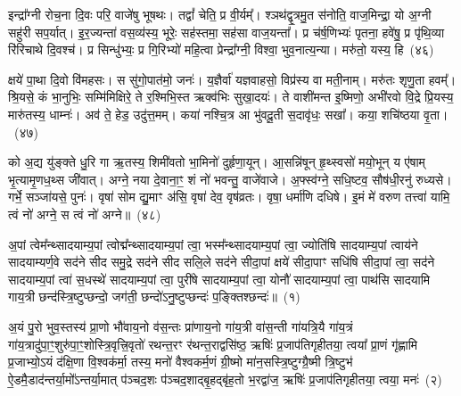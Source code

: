 इन्द्रा᳚ग्नी रोच॒ना दि॒वः परि॒ वाजे॑षु भूषथः। तद्वां᳚ चेति॒ प्र वी॒र्यम्᳚। श्ञथ॑द्वृ॒त्रमु॒त स॑नोति॒ वाज॒मिन्द्रा॒ यो अ॒ग्नी सहु॑री सप॒र्यात्। इ॒र॒ज्यन्ता॑ वस॒व्य॑स्य॒ भूरेः॒ सह॑स्तमा॒ सह॑सा वाज॒यन्ता᳚। प्र च॑र्\mbox{}ष॒णिभ्यः॑ पृतना॒ हवे॑षु॒ प्र पृ॑थि॒व्या रि॑रिचाथे दि॒वश्च॑। प्र सिन्धु॑भ्यः॒ प्र गि॒रिभ्यो॑ महि॒त्वा प्रेन्द्रा᳚ग्नी॒ विश्वा॒ भुव॒नात्य॒न्या। मरु॑तो॒ यस्य॒ हि~(४६)

क्षये॑ पा॒था दि॒वो वि॑महसः। स सु॑गो॒पात॑मो॒ जनः॑। य॒ज्ञैर्वा॑ यज्ञवाहसो॒ विप्र॑स्य वा मती॒नाम्। मरु॑तः शृणु॒ता हवम्᳚। श्रि॒यसे॒ कं भा॒नुभिः॒ सम्मि॑मिक्षिरे॒ ते र॒श्मिभि॒स्त ऋक्व॑भिः सुखा॒दयः॑। ते वाशी॑मन्त इ॒ष्मिणो॒ अभी॑रवो वि॒द्रे प्रि॒यस्य॒ मारु॑तस्य॒ धाम्नः॑। अव॑ ते॒ हेड॒ उदु॑त्त॒मम्। कया॑ नश्चि॒त्र आ भु॑वदू॒ती स॒दावृ॑धः॒ सखा᳚। कया॒ शचि॑ष्ठया वृ॒ता।~(४७)

को अ॒द्य यु॑ङ्क्ते धु॒रि गा ऋ॒तस्य॒ शिमी॑वतो भा॒मिनो॑ दुर्\mbox{}हृणा॒यून्। आ॒सन्नि॑षून् हृ॒थ्स्वसो॑ मयो॒भून् य ए॑षाम् भृ॒त्यामृ॒णध॒थ्स जी॑वात्। अग्ने॒ नया दे॒वाना॒ꣳ॒ शं नो॑ भवन्तु॒ वाजे॑वाजे। अ॒फ्स्व॑ग्ने॒ सधि॒ष्टव॒ सौष॑धी॒रनु॑ रुध्यसे। गर्भे॒ सञ्जा॑यसे॒ पुनः॑। वृषा॑ सोम द्यु॒माꣳ अ॑सि॒ वृषा॑ देव॒ वृष॑व्रतः। वृषा॒ धर्मा॑णि दधिषे। इ॒मं मे॑ वरुण तत्त्वा॑ यामि॒ त्वं नो॑ अग्ने॒ स त्वं नो॑ अग्ने॥~(४८)

{\anuvakamend[{हि वृ॒ता म॒ एका॑\-दश च}]}%


{\anuvakamend[{अ॒पां त्वेम॑न्न॒यं पु॒रो भुवः॒ प्राची᳚ ध्रु॒वक्षि॑ति॒स्त्र्यवि॒रिन्द्रा᳚ग्नी॒ मा छन्द॑ आ॒शुस्त्रि॒वृद॒ग्नेर्भा॒गो᳚\-ऽस्येक॑ये॒यमे॒व सा याग्ने॑ जा॒तान॒ग्निर्वृ॒त्राणि॒ त्रयो॑दश}]}%
{}

\setcounter{anuvakam}{0}
अ॒पां त्वेम᳚न्थ्सादयाम्य॒पां त्वोद्म᳚न्थ्सादयाम्य॒पां त्वा॒ भस्म᳚न्थ्सादयाम्य॒पां त्वा॒ ज्योति॑षि सादयाम्य॒पां त्वाय॑ने सादयाम्यर्ण॒वे सद॑ने सीद समु॒द्रे सद॑ने सीद सलि॒ले सद॑ने सीदा॒पां क्षये॑ सीदा॒पाꣳ सधि॑षि सीदा॒पां त्वा॒ सद॑ने सादयाम्य॒पां त्वा॑ स॒धस्थे॑ सादयाम्य॒पां त्वा॒ पुरी॑षे सादयाम्य॒पां त्वा॒ योनौ॑ सादयाम्य॒पां त्वा॒ पाथ॑सि सादयामि गाय॒त्री छन्द॑स्त्रि॒ष्टुप्छन्दो॒ जग॑ती॒ छन्दो॑\-ऽनु॒ष्टुप्छन्दः॑ प॒ङ्क्तिश्छन्दः॑॥~(१)

{\anuvakamend[{योनौ॒ पञ्च॑दश च}]}%

अ॒यं पु॒रो भुव॒स्तस्य॑ प्रा॒णो भौ॑वाय॒नो व॑स॒न्तः प्रा॑णाय॒नो गा॑य॒त्री वा॑स॒न्ती गा॑यत्रि॒यै गा॑य॒त्रं गा॑य॒त्रादु॑पा॒ꣳ॒शु\-रु॑पा॒ꣳ॒शोस्त्रि॒वृत्त्रि॒वृतो॑ रथन्त॒रꣳ र॑थन्त॒राद्वसि॑ष्ठ॒ ऋषिः॑ प्र॒जा\-प॑तिगृहीतया॒ त्वया᳚ प्रा॒णं गृ॑ह्णामि प्र॒जाभ्यो॒\-ऽयं द॑क्षि॒णा वि॒श्वक॑र्मा॒ तस्य॒ मनो॑ वैश्वकर्म॒णं ग्री॒ष्मो मा॑न॒सस्त्रि॒ष्टुग्ग्रै॒ष्मी त्रि॒ष्टुभ॑ ऐ॒डमै॒डाद॑न्तर्या॒मो᳚\-ऽन्तर्या॒मात् प॑ञ्चद॒शः प॑ञ्चद॒शाद्बृ॒हद्बृ॑ह॒तो भ॒रद्वा॑ज॒ ऋषिः॑ प्र॒जा\-प॑तिगृहीतया॒ त्वया॒ मनः॑~(२)

